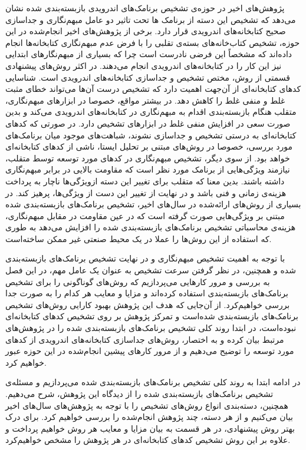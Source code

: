 \label{literature}
پژوهش‌های اخیر در حوزه‌ی تشخیص برنامک‌های اندرویدی بازبسته‌بندی شده نشان می‌دهد که تشخیص این دسته از برنامک ها تحت تاثیر دو عامل مبهم‌نگاری و جداسازی صحیح کتابخانه‌های اندرویدی قرار دارد. برخی از پژوهش‌های اخیر انجام‌شده در این حوزه، تشخیص کتاب‌خانه‌های بسته‌ی تقلبی را با فرض عدم مبهم‌نگاری کتابخانه‌ها انجام داده‌اند که مشخصاً این فرضی نادرست است چرا که بسیاری از مبهم‌نگار‌های ابتدایی نیز این کار را در کتابخانه‌های اندرویدی انجام می‌دهند. در اکثر روش‌های پیشنهادی قسمتی از روش، مختص تشخیص و جداسازی کتابخانه‌های اندرویدی‌ است. شناسایی کد‌های کتابخانه‌ای از آن‌جهت اهمیت دارد که تشخیص درست آن‌ها می‌تواند خطای مثبت غلط و منفی غلط را کاهش دهد. در بیشتر مواقع، خصوصا در ابزار‌های مبهم‌نگاری، متقلب هنگام بازبسته‌بندی اقدام به مبهم‌نگاری در کتابخانه‌های اندرویدی می‌کند و بدین صورت سعی در افزایش منفی غلط در ابزار‌های تشخیص دارد. در صورتی که کد‌های کتابخانه‌ای به درستی تشخیص و جداسازی نشوند، شباهت‌های موجود میان برنامک‌های مورد بررسی، خصوصا در روش‌های مبتنی بر تحلیل ایستا،‌ ناشی از کد‌های کتابخانه‌ای خواهد بود. از سوی دیگر، تشخیص مبهم‌نگاری در کد‌های مورد توسعه توسط متقلب، نیازمند ویژگی‌هایی از برنامک مورد نظر است که مقاومت بالایی در برابر مبهم‌نگاری داشته‌ باشند. بدین معنا که متقلب برای تغییر این دسته ازویژگی‌ها ناچار به پرداخت هزینه‌ی زمانی و فنی باشد و در نهایت از تغییر این دست از ویژگی‌ها، پرهیز کند. در بسیاری از روش‌های ارائه‌شده در سال‌های اخیر، تشخیص برنامک‌های بازبسته‌بندی شده مبتنی بر ویژگی‌هایی صورت گرفته‌ است که در عین مقاومت در مقابل مبهم‌نگاری، هزینه‌ی محاسباتی تشخیص برنامک‌های بازبسته‌بندی شده را افزایش می‌د‌هد به طوری که استفاده از این روش‌ها را عملا در یک محیط صنعتی غیر ممکن ساخته‌است. 

با توجه به اهمیت تشخیص مبهم‌نگاری و در نهایت تشخیص برنامک‌های بازبسته‌بندی شده و همچنین، در نظر گرفتن سرعت تشخیص به عنوان یک عامل مهم، در این فصل به بررسی و مرور کار‌هایی می‌پردازیم که روش‌های گوناگونی را برای تشخیص برنامک‌های بازبسته‌بندی استفاده کرده‌اند و مزایا و معایب هر کدام را به صورت جدا بررسی خواهیم‌کرد. از آن‌جایی که هدف این پژوهش بهبود کارایی روش‌های تشخیص برنامک‌های بازبسته‌بندی شده‌است و تمرکز پژوهش بر روی تشخیص کد‌های کتابخانه‌ای نبوده‌است، در ابتدا روند کلی تشخیص برنامک‌های بازبسته‌بندی‌ شده را در پژوهش‌های مرتبط بیان کرده و به اختصار، روش‌های جداسازی کتابخانه‌های اندرویدی از کد‌های مورد توسعه را توضیح می‌دهیم و از مرور کار‌های پیشین انجام‌شده در این حوزه عبور خواهیم کرد.

در ادامه ابتدا به روند کلی تشخیص برنامک‌های بازبسته‌بندی شده می‌پردازیم و مسئله‌ی تشخیص برنامک‌های بازبسته‌بندی شده را از دیدگاه این پژوهش، شرح می‌دهیم. همچنین، دسته‌بندی انواع روش‌های تشخیص را با توجه به پژوهش‌های سال‌های اخیر بیان‌ می‌کنیم و از هر دسته، چند پژوهش انجام‌شده را بررسی خواهیم کرد. برای درک بهتر روش‌ پیشنهادی، در هر قسمت به بیان مزایا و معایب هر روش خواهیم پرداخت و علاوه بر این روش تشخیص کد‌های ‌کتابخانه‌ای در هر پژوهش را مشخص خواهیم‌کرد.


